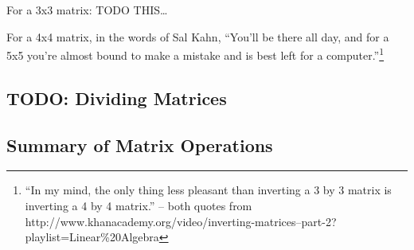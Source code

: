 For a 3x3 matrix:
%
TODO THIS\ldots

For a 4x4 matrix, in the words of Sal Kahn, ``You'll be there all day, and for a
5x5 you're almost bound to make a mistake and is best left for a
computer.''\footnote{``In my mind, the only thing less pleasant than inverting
a 3 by 3 matrix is inverting a 4 by 4 matrix.'' -- both quotes from
http://www.khanacademy.org/video/inverting-matrices--part-2?playlist=Linear\%20Algebra}

\subsection{TODO: Dividing Matrices}
\label{sec:DividingMatrices}

\subsection{Summary of Matrix Operations}
\label{sec:SummaryOfMatrixOperations}

\newpage
